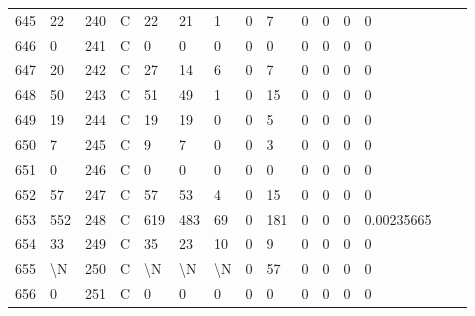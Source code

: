 \begin{longtable}{lllllllllllllll}
	645 & 22                & 240 & C   & 22                & 21                & 1                 & 0    & 7          & 0              & 0              & 0             & 0            \\
	646 & 0                 & 241 & C   & 0                 & 0                 & 0                 & 0    & 0          & 0              & 0              & 0             & 0            \\
	647 & 20                & 242 & C   & 27                & 14                & 6                 & 0    & 7          & 0              & 0              & 0             & 0            \\
	648 & 50                & 243 & C   & 51                & 49                & 1                 & 0    & 15         & 0              & 0              & 0             & 0            \\
	649 & 19                & 244 & C   & 19                & 19                & 0                 & 0    & 5          & 0              & 0              & 0             & 0            \\
	650 & 7                 & 245 & C   & 9                 & 7                 & 0                 & 0    & 3          & 0              & 0              & 0             & 0            \\
	651 & 0                 & 246 & C   & 0                 & 0                 & 0                 & 0    & 0          & 0              & 0              & 0             & 0            \\
	652 & 57                & 247 & C   & 57                & 53                & 4                 & 0    & 15         & 0              & 0              & 0             & 0            \\
	653 & 552               & 248 & C   & 619               & 483               & 69                & 0    & 181        & 0              & 0              & 0             & 0.00235665   \\
	654 & 33                & 249 & C   & 35                & 23                & 10                & 0    & 9          & 0              & 0              & 0             & 0            \\
	655 & \textbackslash{}N & 250 & C   & \textbackslash{}N & \textbackslash{}N & \textbackslash{}N & 0    & 57         & 0              & 0              & 0             & 0            \\
	656 & 0                 & 251 & C   & 0                 & 0                 & 0                 & 0    & 0          & 0              & 0              & 0             & 0            \\

\end{longtable}
